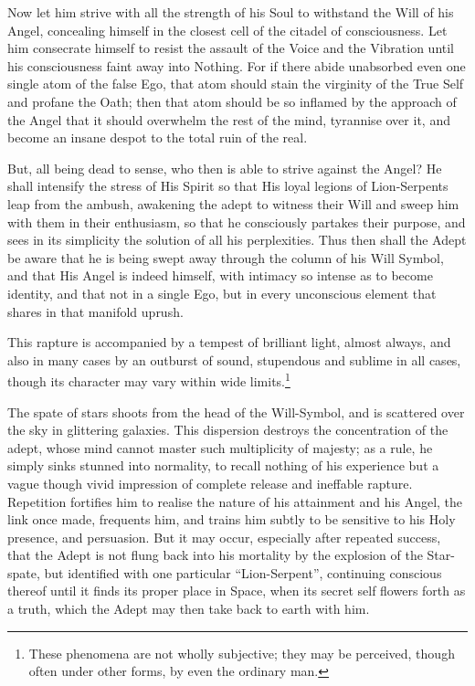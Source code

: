 Now let him strive with all the strength of his Soul to withstand the Will of his Angel, concealing himself in the closest cell of the citadel of consciousness. Let him consecrate himself to resist the assault of the Voice and the Vibration until his consciousness faint away into Nothing. For if there abide unabsorbed even one single atom of the false Ego, that atom should stain the virginity of the True Self and profane the Oath; then that atom should be so inflamed by the approach of the Angel that it should overwhelm the rest of the mind, tyrannise over it, and become an insane despot to the total ruin of the real.

But, all being dead to sense, who then is able to strive against the Angel? He shall intensify the stress of His Spirit so that His loyal legions of Lion-Serpents leap from the ambush, awakening the adept to witness their Will and sweep him with them in their enthusiasm, so that he consciously partakes their purpose, and sees in its simplicity the solution of all his perplexities. Thus then shall the Adept be aware that he is being swept away through the column of his Will Symbol, and that His Angel is indeed himself, with intimacy so intense as to become identity, and that not in a single Ego, but in every unconscious element that shares in that manifold uprush.

This rapture is accompanied by a tempest of brilliant light, almost always, and also in many cases by an outburst of sound, stupendous and sublime in all cases, though its character may vary within wide limits.\footnote{These phenomena are not wholly subjective; they may be perceived, though often under other forms, by even the ordinary man.}

The spate of stars shoots from the head of the Will-Symbol, and is scattered over the sky in glittering galaxies. This dispersion destroys the concentration of the adept, whose mind cannot master such multiplicity of majesty; as a rule, he simply sinks stunned into normality, to recall nothing of his experience but a vague though vivid impression of complete release and ineffable rapture. Repetition fortifies him to realise the nature of his attainment and his Angel, the link once made, frequents him, and trains him subtly to be sensitive to his Holy presence, and persuasion. But it may occur, especially after repeated success, that the Adept is not flung back into his mortality by the explosion of the Star-spate, but identified with one particular \enquote{Lion-Serpent}, continuing conscious thereof until it finds its proper place in Space, when its secret self flowers forth as a truth, which the Adept may then take back to earth with him.

